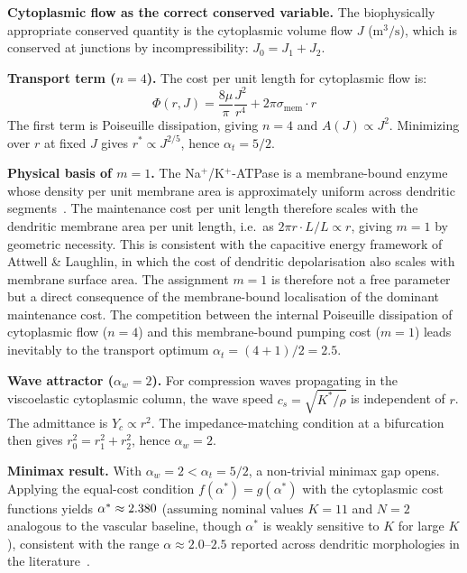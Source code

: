 \documentclass[11pt,a4paper]{article}
\theoremstyle{remark}
\begin{document}
\noindent\textbf{Cytoplasmic flow as the correct conserved variable.} The biophysically appropriate conserved quantity is the cytoplasmic volume flow $J$ ($\text{m}^3/\text{s}$), which is conserved at junctions by incompressibility: $J_0 = J_1 + J_2$.

\noindent\textbf{Transport term ($n=4$).} The cost per unit length for cytoplasmic flow is:
\begin{equation}
\label{eq:cytoplasmic_cost}
\Phi(r, J) = \frac{8\mu}{\pi} \frac{J^2}{r^4} + 2\pi\sigma_{\text{mem}} \cdot r
\end{equation}
The first term is Poiseuille dissipation, giving $n=4$ and $A(J) \propto J^2$.
Minimizing over $r$ at fixed $J$ gives $r^* \propto J^{2/5}$, hence $\alpha_t =
5/2$.

\noindent\textbf{Physical basis of $m = 1$.} The Na$^+$/K$^+$-ATPase is a
membrane-bound enzyme whose density per unit membrane area is approximately
uniform across dendritic segments~\cite{attwell2001}. The maintenance cost
per unit length therefore scales with the dendritic membrane area per unit
length, i.e.\ as $2\pi r \cdot L / L \propto r$, giving $m = 1$ by geometric
necessity. This is consistent with the capacitive energy framework of Attwell \& Laughlin,
in which the cost of dendritic depolarisation also scales
with membrane surface area. The assignment $m = 1$ is therefore not a
free parameter but a direct consequence of the membrane-bound localisation
of the dominant maintenance cost. The competition between the internal
Poiseuille dissipation of cytoplasmic flow ($n=4$) and this membrane-bound
pumping cost ($m=1$) leads inevitably to the transport optimum $\alpha_t =
(4+1)/2 = 2.5$.

\noindent\textbf{Wave attractor ($\alpha_w=2$).} For compression waves propagating in the viscoelastic cytoplasmic column, the wave speed $c_s = \sqrt{K^*/\rho}$ is independent of $r$. The admittance is $Y_c \propto r^2$. The impedance-matching condition at a bifurcation then gives $r_0^2 = r_1^2 + r_2^2$, hence $\alpha_w = 2$.

\noindent\textbf{Minimax result.} With $\alpha_w = 2 < \alpha_t = 5/2$, a non-trivial minimax gap opens. Applying the equal-cost condition $f(\alpha^*) = g(\alpha^*)$ with the cytoplasmic cost functions yields $\alpha^* \approx 2.380{}$ (assuming nominal values $K=11$ and $N=2$ analogous to the vascular baseline, though $\alpha^*$ is weakly sensitive to $K$ for large $K$), consistent with the range $\alpha \approx 2.0$--$2.5$ reported across dendritic morphologies in the literature~\cite{cuntz2010}.
\end{document}
